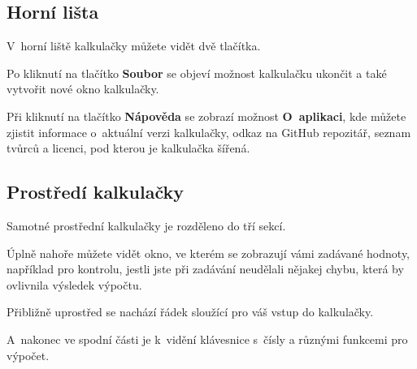 \documentclass[12pt]{article}
\begin{document}
\subsection{Horní lišta}
V~horní liště kalkulačky můžete vidět dvě tlačítka.

Po kliknutí na tlačítko \textbf{Soubor} se objeví možnost kalkulačku ukončit a také vytvořit nové okno kalkulačky. 

Při kliknutí na tlačítko \textbf{Nápověda} se zobrazí možnost \textbf{O~aplikaci}, kde můžete zjistit informace o~aktuální verzi kalkulačky, odkaz na GitHub repozitář, seznam tvůrců a licenci, pod kterou je kalkulačka šířená.
\subsection{Prostředí kalkulačky}
Samotné prostřední kalkulačky je rozděleno do tří sekcí.

Úplně nahoře můžete vidět okno, ve kterém se zobrazují vámi zadávané hodnoty, například pro kontrolu, jestli jste při zadávání neudělali nějakej chybu, která by ovlivnila výsledek výpočtu.

Přibližně uprostřed se nachází řádek sloužící pro váš vstup do kalkulačky.

A~nakonec ve spodní části je k~vidění klávesnice s~čísly a různými funkcemi pro výpočet.
\end{document}
